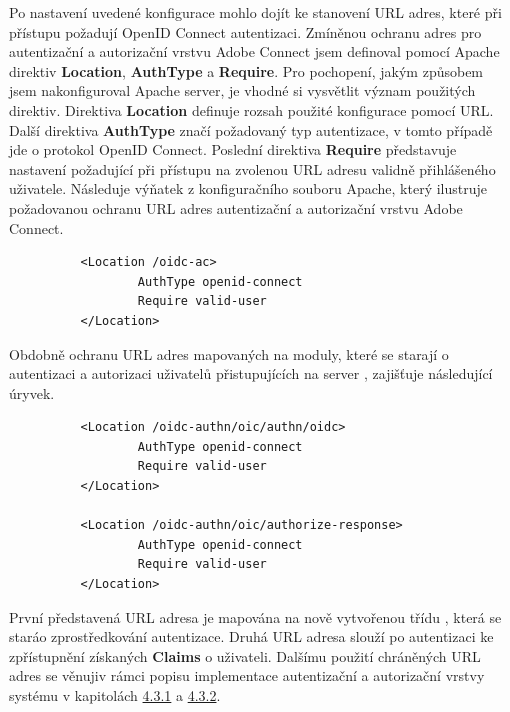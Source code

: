 \documentclass[
  printed, %
  twoside, %
  table,   %
  nolof,     %
  nolot,     %
]{fithesis3}
\begin{document}
Po nastavení uvedené konfigurace mohlo dojít ke stanovení URL adres, které při přístupu požadují OpenID Connect autentizaci. Zmíněnou ochranu adres pro autentizační a autorizační vrstvu Adobe Connect jsem definoval pomocí Apache direktiv \textbf{Location}, \textbf{AuthType} a \textbf{Require}. Pro pochopení, jakým způsobem jsem nakonfiguroval Apache server, je vhodné si vysvětlit význam použitých direktiv. Direktiva \textbf{Location} definuje rozsah použité konfigurace pomocí URL. Další direktiva \textbf{AuthType} značí požadovaný typ autentizace, v tomto případě jde o protokol OpenID Connect. Poslední direktiva \textbf{Require} představuje nastavení požadující při přístupu na zvolenou URL adresu validně přihlášeného uživatele. Následuje výňatek z konfiguračního souboru Apache, který ilustruje požadovanou ochranu URL adres autentizační a autorizační vrstvu Adobe Connect.
\begin{lstlisting}
          <Location /oidc-ac>
                  AuthType openid-connect
                  Require valid-user
          </Location>
\end{lstlisting}
\label{ac-location}

Obdobně ochranu URL adres mapovaných na moduly, které se starají o autentizaci a autorizaci uživatelů přistupujících na server , zajišťuje následující úryvek. 

\begin{lstlisting}
          <Location /oidc-authn/oic/authn/oidc>
                  AuthType openid-connect
                  Require valid-user
          </Location>
          
          <Location /oidc-authn/oic/authorize-response>
                  AuthType openid-connect
                  Require valid-user
          </Location>
\end{lstlisting}
První představená URL adresa  je mapována na nově vytvořenou třídu , která se stará\break o zprostředkování autentizace. Druhá URL adresa  slouží po autentizaci ke zpřístupnění získaných \textbf{Claims} o uživateli. Dalšímu použití  chráněných URL adres se věnuji\break v rámci popisu implementace autentizační a autorizační vrstvy systému  v kapitolách \hyperref[ShongoImpl-authn]{4.3.1} a \hyperref[ShongoImpl-authn]{4.3.2}.

\label{shongo-location}
\end{document}
